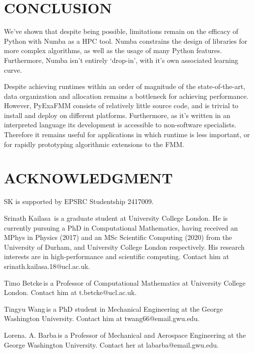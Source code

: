 \documentclass{IEEEcsmag}
\begin{document}
\section{CONCLUSION}

We've shown that despite being possible, limitations remain on the efficacy of Python with Numba as a HPC tool. Numba constrains the design of libraries for more complex algorithms, as well as the usage of many Python features. Furthermore, Numba isn't entirely `drop-in', with it's own associated learning curve.

Despite achieving runtimes within an order of magnitude of the state-of-the-art, data organization and allocation remains a bottleneck for achieving performance. However, PyExaFMM consists of relatively little source code, and is trivial to install and deploy on different platforms. Furthermore, as it's written in an interpreted language its development is accessible to non-software specialists. Therefore it remains useful for applications in which runtime is less important, or for rapidly prototyping algorithmic extensions to the FMM.

\section{ACKNOWLEDGMENT}

SK is supported by EPSRC Studentship 2417009.




\begin{IEEEbiography}{Srinath Kailasa}{\,} is a graduate student at University College London. He is currently pursuing a PhD in Computational Mathematics, having received an MPhys in Physics (2017) and an MSc Scientific Computing (2020) from the University of Durham, and University College London respectively. His research interests are in high-performance and scientific computing. Contact him at srinath.kailasa.18@ucl.ac.uk.
\end{IEEEbiography}

\begin{IEEEbiography}{Timo Betcke}{\,}is a Professor of Computational Mathematics at University College London. Contact him at t.betcke@ucl.ac.uk.
\end{IEEEbiography}

\begin{IEEEbiography}{Tingyu Wang}{\,}is a PhD student in Mechanical Engineering at the George Washington University. Contact him at twang66@email.gwu.edu.
\end{IEEEbiography}

\begin{IEEEbiography}{Lorena. A. Barba}{\,}is a Professor of Mechanical and Aerospace Engineering at the George Washington University.  Contact her at labarba@email.gwu.edu.
\end{IEEEbiography}
\end{document}
